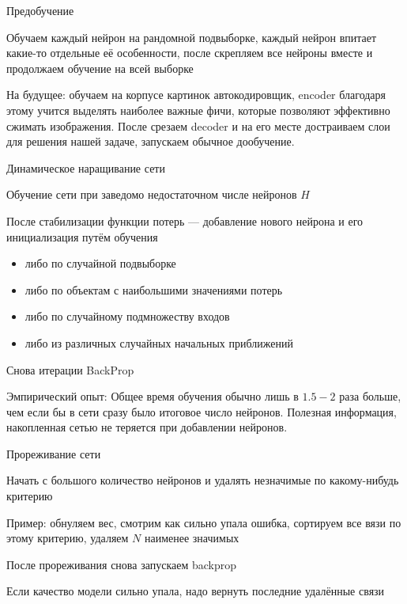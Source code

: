 \documentclass[notes,12pt, aspectratio=169]{beamer}
\newenvironment{wideitemize}{\itemize\addtolength{\itemsep}{10pt}}{\enditemize}
\begin{document}
\begin{frame}{Предобучение}
\begin{wideitemize}
	\item  Обучаем каждый нейрон на рандомной подвыборке, каждый нейрон впитает какие-то отдельные её особенности, после скрепляем все нейроны вместе и продолжаем обучение на всей выборке
	
	\item  \alert{На будущее:} обучаем на корпусе картинок автокодировщик, encoder благодаря этому учится выделять наиболее важные фичи, которые позволяют эффективно сжимать изображения. После срезаем decoder и на его месте достраиваем слои для решения нашей задаче, запускаем обычное дообучение.
\end{wideitemize}
\end{frame}


\begin{frame}{Динамическое наращивание сети}
\begin{wideitemize}
\item  Обучение сети при заведомо недостаточном числе нейронов $H$
\item После стабилизации функции потерь — добавление нового нейрона и его инициализация путём обучения 
\begin{itemize}
	\item либо по случайной подвыборке 
	\item либо по объектам с наибольшими значениями потерь 
	\item либо по случайному подмножеству входов
	\item либо из различных случайных начальных приближений
\end{itemize}
\item Снова итерации BackProp
\end{wideitemize}

\vfill
\begin{center}
\alert{Эмпирический опыт:} Общее время обучения обычно лишь в $1.5-2$ раза больше, чем если бы в сети сразу было итоговое число нейронов. Полезная информация, накопленная сетью не теряется при добавлении нейронов.
\end{center}
\end{frame}


\begin{frame}{Прореживание сети}
\begin{wideitemize}
\item Начать с большого количество нейронов и удалять незначимые по какому-нибудь критерию 
\item \alert{Пример:} обнуляем вес, смотрим как сильно упала ошибка, сортируем все вязи по этому критерию, удаляем $N$ наименее значимых
\item После прореживания снова запускаем backprop
\item Если качество модели сильно упала, надо вернуть последние удалённые связи 
\end{wideitemize}
\end{frame}
\end{document}
